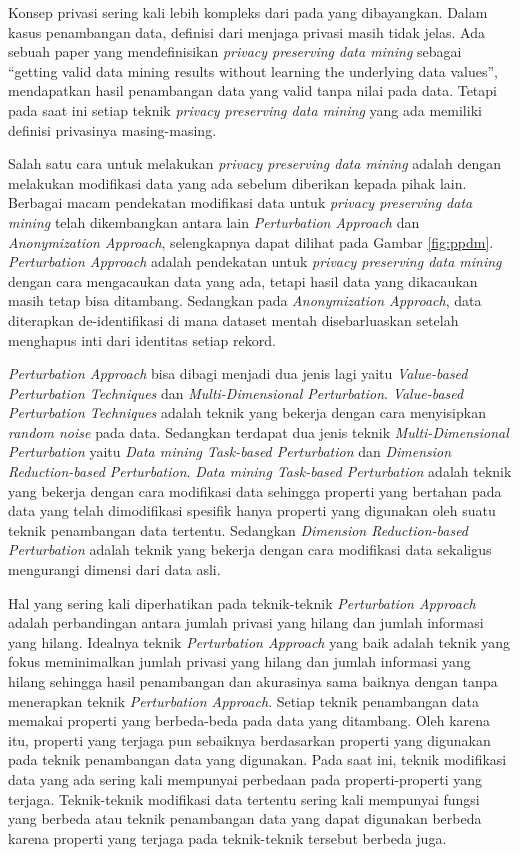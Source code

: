 \documentclass[a4paper,twoside]{article}
\begin{document}
\begin{enumerate}
		Konsep privasi sering kali lebih kompleks dari pada yang dibayangkan. Dalam kasus penambangan data, definisi dari menjaga privasi masih tidak jelas. Ada sebuah paper yang mendefinisikan \textit{privacy preserving data mining} sebagai “getting valid data mining results without learning the underlying data values”, mendapatkan hasil penambangan data yang valid tanpa  nilai pada data. Tetapi pada saat ini setiap teknik \textit{privacy preserving data mining} yang ada memiliki definisi privasinya masing-masing. 
		
		Salah satu cara untuk melakukan \textit{privacy preserving data mining} adalah dengan melakukan modifikasi data yang ada sebelum diberikan kepada pihak lain. Berbagai macam pendekatan modifikasi data untuk \textit{privacy preserving data mining} telah dikembangkan antara lain \textit{Perturbation Approach} dan \textit{Anonymization Approach}, selengkapnya dapat dilihat pada Gambar \ref{fig:ppdm}. \textit{Perturbation Approach} adalah pendekatan untuk \textit{privacy preserving data mining} dengan cara mengacaukan data yang ada, tetapi hasil data yang dikacaukan masih tetap bisa ditambang. Sedangkan pada \textit{Anonymization Approach}, data diterapkan de-identifikasi di mana dataset mentah disebarluaskan setelah menghapus inti dari identitas setiap rekord.
		
		\textit{Perturbation Approach} bisa dibagi menjadi dua jenis lagi yaitu \textit{Value-based Perturbation Techniques} dan \textit{Multi-Dimensional Perturbation}. \textit{Value-based Perturbation Techniques} adalah teknik yang bekerja dengan cara menyisipkan \textit{random noise} pada data. Sedangkan terdapat dua jenis teknik \textit{Multi-Dimensional Perturbation} yaitu \textit{Data mining Task-based Perturbation} dan \textit{Dimension Reduction-based Perturbation}. \textit{Data mining Task-based Perturbation} adalah teknik yang bekerja dengan cara modifikasi data sehingga properti yang bertahan pada data yang telah dimodifikasi spesifik hanya properti yang digunakan oleh suatu teknik penambangan data tertentu. Sedangkan \textit{Dimension Reduction-based Perturbation} adalah teknik yang bekerja dengan cara modifikasi data sekaligus mengurangi dimensi dari data asli.
		
		Hal yang sering kali diperhatikan pada teknik-teknik \textit{Perturbation Approach} adalah perbandingan antara jumlah privasi yang hilang dan jumlah informasi yang hilang. Idealnya teknik \textit{Perturbation Approach} yang baik adalah teknik yang fokus meminimalkan jumlah privasi yang hilang dan jumlah informasi yang hilang sehingga hasil penambangan dan akurasinya sama baiknya dengan tanpa menerapkan teknik \textit{Perturbation Approach}. Setiap teknik penambangan data memakai properti yang berbeda-beda pada data yang ditambang. Oleh karena itu, properti yang terjaga pun sebaiknya berdasarkan properti yang digunakan pada teknik penambangan data yang digunakan. Pada saat ini, teknik modifikasi data yang ada sering kali mempunyai perbedaan pada properti-properti yang terjaga. Teknik-teknik modifikasi data tertentu sering kali mempunyai fungsi yang berbeda atau teknik penambangan data yang dapat digunakan berbeda karena properti yang terjaga pada teknik-teknik tersebut berbeda juga.


\end{enumerate}
\end{document}
